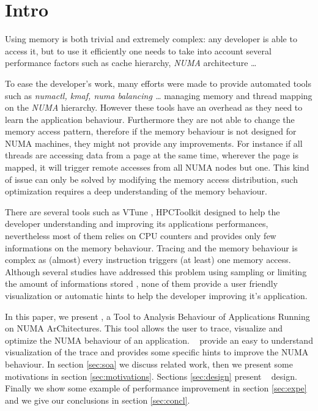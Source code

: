 
\section{Intro}
\label{sec:intro}

Using memory is both trivial and extremely complex: any developer is able to
access it, but to use it efficiently one needs to take into account several
performance factors such as cache hierarchy, \emph{NUMA} architecture
\cite{Drepper07What} \ldots

To ease the developer's work, many efforts were made to provide automated
tools such as \emph{numactl, kmaf, numa balancing \ldots}
managing memory and thread mapping on the \emph{NUMA} hierarchy. However these
tools have an overhead as they need to learn the application behaviour.
Furthermore they are not able to change the memory access pattern, therefore
if the memory behaviour is not designed for NUMA machines, they might not
provide any improvements. For instance if all threads are accessing data from a
page at the same time, wherever the page is mapped, it will trigger remote
accesses from all NUMA nodes but one. This kind of issue can only be solved by
modifying the memory access distribution, such optimization requires a deep
understanding of the memory behaviour.

There are several tools such as VTune \cite{Reinders05VTune},
HPCToolkit\cite{Adhianto10HPCTOOLKIT}  designed to help the
developer understanding and improving its applications performances,
nevertheless most of them relies on CPU counters and provides only few
informations on the memory behaviour. Tracing and the memory behaviour is
complex as (almost) every instruction triggers (at least) one memory access.
Although several studies have addressed this problem using sampling
\cite{Lachaize12MemProf} or limiting the amount of informations stored
, none of them provide a user friendly visualization or automatic hints
to help the developer improving it's application.


In this paper, we present \TABARNAC, a Tool to Analysis Behaviour of
Applications Running on NUMA ArChitectures. This tool allows the user to
trace, visualize and optimize the NUMA behaviour of an application.
\TABARNAC~ provide an easy to understand visualization of the trace and
provides some specific hints to improve the NUMA behaviour. In section
\ref{sec:soa} we discuss related work, then we present some motivations in
section \ref{sec:motivations}. Sections \ref{sec:design} present \TABARNAC~
design.  Finally we show some example of performance improvement in section
\ref{sec:expe} and we give our conclusions in section \ref{sec:concl}.
